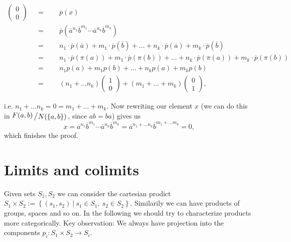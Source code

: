 \documentclass[11pt]{book}
\numberwithin{dummy}{section}
\theoremstyle{nonumberbreak}
\newenvironment{ex}[1][]{\ifthenelse{\equal{#1}{}}{\example}{\example[#1]}\rm}{\endexample}
\newcommand{\la}{\longrightarrow}
\newcommand{\slant}[2]{{\raisebox{.1em}{$#1$}\left/\raisebox{-.1em}{$#2$}\right.}}
\begin{document}
\begin{spacing}{1.4}
\begin{ex}
\setlength{\abovedisplayskip}{5.5pt}
\setlength{\belowdisplayskip}{5.5pt}
\begin{alignat*}{5}
\begin{pmatrix}0 \\[-6pt]0 \end{pmatrix} \ \ \ &=&& \ \ \ \overline{p}(x) \\
&=&& \ \ \ \overline{p}\left(\overline{a}^{n_1}\overline{b}^{m_1} \cdots \overline{a}^{n_k} \overline{b}^{m_k}\right) \\
&=&& \ \ \ n_1 \cdot \overline{p}\left(\overline{a}\right) + m_1 \cdot \overline{p}\left(\overline{b}\right) + \ldots + n_k \cdot \overline{p}\left(\overline{a}\right) + m_k \cdot \overline{p}\left(\overline{b}\right) \\
&=&& \ \ \ n_1 \cdot \overline{p}\left(\pi(a)\right) + m_1 \cdot \overline{p}\left(\pi(b)\right) + \ldots + n_k \cdot \overline{p}\left(\pi(a)\right) + m_k \cdot \overline{p}\left(\pi(b)\right)\\
&=&& \ \ \ n_1 p(a) + m_1 p(b) + \ldots + n_k p(a) + m_k p(b) \\
&=&& \ \ \ (n_1 + \ldots n_k) \begin{pmatrix} 1\\[-6pt]0\end{pmatrix} + (m_1 + \ldots + m_k) \begin{pmatrix}0 \\[-6pt]1 \end{pmatrix},
\end{alignat*}

i.e. $n_1+ \ldots n_k = 0 = m_1 + \ldots + m_k$. Now rewriting our element $x$ (we can do this in $\slant{F(a,b)}{N(\{a,b\})}$, since $ab=ba$) gives us 
$$x= \overline{a}^{n_1}\overline{b}^{m_1} \cdots \overline{a}^{n_k} \overline{b}^{m_k} = \overline{a}^{n_1+ \ldots n_k} \overline{b}^{m_1+ \ldots m_k} = 0,$$
which finishes the proof.



\end{ex}





\section{Limits and colimits} %






Given sets $S_1, S_2$ we can consider the cartesian prodict $S_1 \times S_2 := \left\{ (s_1, s_2) \ \vert \ s_1 \in S_1, \ s_2 \in S_2 \right\}$. Similarily we can have products of groups, spaces and so on. In the following we should try to characterize products more categorically. Key observation: We always have projection into the components $p_i: S_1 \times S_2 \la S_i$.



\end{spacing}
\end{document}
